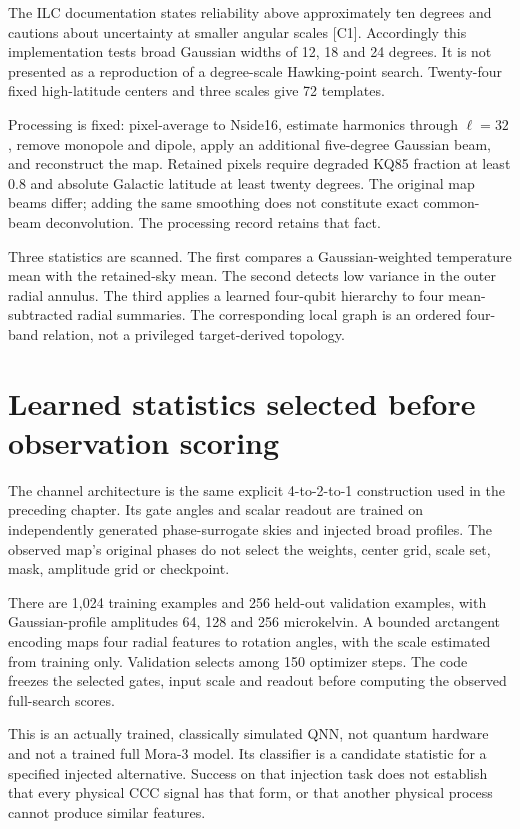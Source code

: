 The ILC documentation states reliability above approximately ten degrees and cautions about uncertainty at smaller angular scales [C1]. Accordingly this implementation tests broad Gaussian widths of 12, 18 and 24 degrees. It is not presented as a reproduction of a degree-scale Hawking-point search. Twenty-four fixed high-latitude centers and three scales give 72 templates.

Processing is fixed: pixel-average to Nside16, estimate harmonics through $\ell=32$, remove monopole and dipole, apply an additional five-degree Gaussian beam, and reconstruct the map. Retained pixels require degraded KQ85 fraction at least 0.8 and absolute Galactic latitude at least twenty degrees. The original map beams differ; adding the same smoothing does not constitute exact common-beam deconvolution. The processing record retains that fact.

Three statistics are scanned. The first compares a Gaussian-weighted temperature mean with the retained-sky mean. The second detects low variance in the outer radial annulus. The third applies a learned four-qubit hierarchy to four mean-subtracted radial summaries. The corresponding local graph is an ordered four-band relation, not a privileged target-derived topology.

\section{Learned statistics selected before observation scoring}

The channel architecture is the same explicit 4-to-2-to-1 construction used in the preceding chapter. Its gate angles and scalar readout are trained on independently generated phase-surrogate skies and injected broad profiles. The observed map's original phases do not select the weights, center grid, scale set, mask, amplitude grid or checkpoint.

There are 1,024 training examples and 256 held-out validation examples, with Gaussian-profile amplitudes 64, 128 and 256 microkelvin. A bounded arctangent encoding maps four radial features to rotation angles, with the scale estimated from training only. Validation selects among 150 optimizer steps. The code freezes the selected gates, input scale and readout before computing the observed full-search scores.

This is an actually trained, classically simulated QNN, not quantum hardware and not a trained full Mora-3 model. Its classifier is a candidate statistic for a specified injected alternative. Success on that injection task does not establish that every physical CCC signal has that form, or that another physical process cannot produce similar features.

